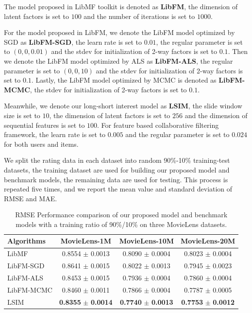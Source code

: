 \documentclass{sig-alternate-05-2015}
\begin{document}
The model proposed in LibMF toolkit is denoted as \textbf{LibFM},
the dimension of latent factors is set to $100$ and the number of
iterations is set to $1000$.

For the model proposed in LibFM, we denote the LibFM model optimized by
SGD as \textbf{LibFM-SGD}, the learn rate is set to $0.01$, the regular
parameter is set to $(0,0,0.01)$ and the stdev for initialization of 2-way
factors is set to $0.1$. Then we denote the LibFM model optimized by ALS
as \textbf{LibFM-ALS}, the regular parameter is set to $(0,0,10)$ and the
stdev for initialization of 2-way factors is set to $0.1$. Lastly, the
LibFM model optimized by MCMC is denoted as \textbf{LibFM-MCMC}, the stdev
for initialization of 2-way factors is set to $0.1$.

Meanwhile, we denote our long-short interest model as \textbf{LSIM},
the slide window size is set to $10$, the dimension of latent factors is
set to $256$ and the dimension of sequential features is set to $100$.
For feature based collaborative filtering framework, the learn rate is set
to $0.005$ and the regular parameter is set to $0.024$ for both users and items.

We split the rating data in each dataset into random 90\%-10\% training-test
datasets, the training dataset are used for building our proposed model
and benchmark models, the remaining data are used for testing.
This process is repeated five times, and we report the mean value and
standard deviation of RMSE and MAE.

\begin{table}[htbp]
	\centering
	\caption{RMSE Performance comparison of our proposed model and benchmark models
    with a training ratio of 90\%/10\% on three MovieLens datasets.}
	\label{tab:msre}
	\begin{tabular}{|l|c|c|c|}
		\hline
		\textbf{Algorithms} & \textbf{MovieLens-1M} & \textbf{MovieLens-10M} & \textbf{MovieLens-20M} \\
		\hline
		LibMF      & 0.8554 $\pm$ 0.0013 & 0.8090 $\pm$ 0.0004 & 0.8023 $\pm$ 0.0004 \\
		LibFM-SGD  & 0.8641 $\pm$ 0.0015 & 0.8022 $\pm$ 0.0013 & 0.7945 $\pm$ 0.0023 \\
		LibFM-ALS  & 0.8453 $\pm$ 0.0015 & 0.7936 $\pm$ 0.0004 & 0.7860 $\pm$ 0.0004 \\
        LibFM-MCMC & 0.8460 $\pm$ 0.0011 & 0.7866 $\pm$ 0.0004 & 0.7787 $\pm$ 0.0005 \\
		LSIM       & \textbf{0.8355} $\pm$ \textbf{0.0014} & \textbf{0.7740} $\pm$ \textbf{0.0013} & \textbf{0.7753} $\pm$ \textbf{0.0012} \\
		\hline
	\end{tabular}
\end{table}
\end{document}
